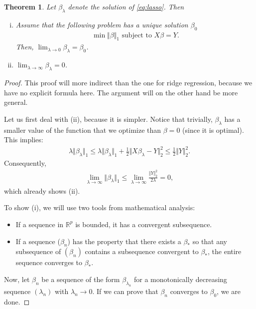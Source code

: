 \documentclass{article}
\newcommand{\R}{\mathbb{R}}
\newtheorem{theorem}{Theorem}
\newcommand{\norm}[1]{\Vert #1 \Vert}
\begin{document}
\begin{theorem}
    Let $\beta_\lambda$ denote the solution of \eqref{eq:lasso}. Then
    \begin{enumerate}[(i)]
        \item Assume that the following problem has a unique solution $\beta_0$
        \begin{align}
            \min \norm{\beta}_1 \text{ subject to } X\beta = Y. \label{eq:BP}
        \end{align}
        Then, $\lim_{\lambda \to 0} \beta_\lambda = \beta_0$.
        \item $\lim_{\lambda \to \infty} \beta_\lambda = 0$.
    \end{enumerate}

\end{theorem}
\begin{proof}
    This proof will more indirect than the one for ridge regression, because we have no explicit formula here. The argument will on the other hand be more general.

    Let us first deal with (ii), because it is simpler. Notice that trivially, $\beta_\lambda$ has a smaller value of the function that we optimize than $\beta=0$ (since it is optimal). This implies:
    \begin{align*}
        \lambda \norm{\beta_\lambda}_1 \leq \lambda \norm{\beta_\lambda}_1  + \tfrac{1}{2}\norm{X\beta_\lambda - Y }_2^2 \leq \tfrac{1}{2}\norm{Y}_2^2.
    \end{align*}
    Consequently,
    \begin{align*}
        \lim_{\lambda \to \infty} \norm{\beta_\lambda}_1 \leq \lim_{\lambda \to \infty} \frac{\norm{Y}_2^2}{2\lambda} = 0,
    \end{align*}
    which already shows (ii).
 
    To show (i), we will use two tools from mathematical analysis:
    \begin{itemize}
        \item If a sequence in $\R^p$ is bounded, it has a convergent subsequence.
        \item If a sequence ($\beta_n$) has the property that there exists a $\beta_*$ so that any subsequence of $(\beta_n)$ contains a subsequence convergent to $\beta_*$, the entire sequence converges to $\beta_*$.
    \end{itemize}
    Now, let $\beta_n$ be a sequence of the form $\beta_{\lambda_n}$ for a monotonically decreasing sequence $(\lambda_n)$ with $\lambda_n \to 0$. If we can prove that $\beta_n$ converges to $\beta_0$, we are done.


\end{proof}
\end{document}
